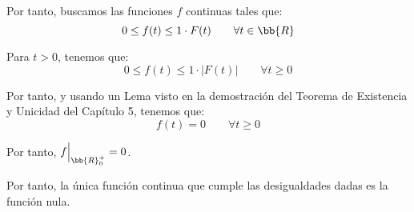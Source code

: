 \documentclass[12pt]{article}
\begin{document}
\begin{ejercicio}
\begin{itemize}
            Por tanto, buscamos las funciones $f$ continuas tales que:
            \begin{equation*}
                0\leq f(t)\leq 1\cdot F(t)\qquad \forall t\in \bb{R}
            \end{equation*}

            Para $t>0$, tenemos que:
            \begin{equation*}
                0\leq f(t)\leq 1\cdot |F(t)|\qquad \forall t\geq 0
            \end{equation*}

            Por tanto, y usando un Lema visto en la demostración del Teorema de Existencia y Unicidad del Capítulo 5, tenemos que:
            \begin{equation*}
                f(t)=0\qquad \forall t\geq 0
            \end{equation*}

            Por tanto, $f\Big|_{\bb{R}^+_0}=0$.
        \end{itemize}

        Por tanto, la única función continua que cumple las desigualdades dadas es la función nula.
    \end{ejercicio}
\end{document}
